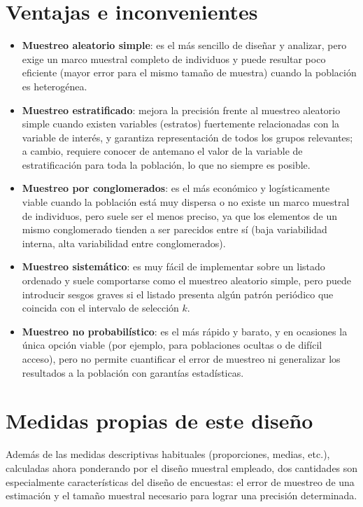 \documentclass[
  spanish,
  a4paper,
]{scrreport}
\providecommand{\tightlist}{%
  \setlength{\itemsep}{0pt}\setlength{\parskip}{0pt}}
\theoremstyle{definition}
\theoremstyle{definition}
\theoremstyle{remark}
\begin{document}
\section{Ventajas e inconvenientes}\label{ventajas-e-inconvenientes-7}

\begin{itemize}
\tightlist
\item
  \textbf{Muestreo aleatorio simple}: es el más sencillo de diseñar y
  analizar, pero exige un marco muestral completo de individuos y puede
  resultar poco eficiente (mayor error para el mismo tamaño de muestra)
  cuando la población es heterogénea.
\item
  \textbf{Muestreo estratificado}: mejora la precisión frente al
  muestreo aleatorio simple cuando existen variables (estratos)
  fuertemente relacionadas con la variable de interés, y garantiza
  representación de todos los grupos relevantes; a cambio, requiere
  conocer de antemano el valor de la variable de estratificación para
  toda la población, lo que no siempre es posible.
\item
  \textbf{Muestreo por conglomerados}: es el más económico y
  logísticamente viable cuando la población está muy dispersa o no
  existe un marco muestral de individuos, pero suele ser el menos
  preciso, ya que los elementos de un mismo conglomerado tienden a ser
  parecidos entre sí (baja variabilidad interna, alta variabilidad entre
  conglomerados).
\item
  \textbf{Muestreo sistemático}: es muy fácil de implementar sobre un
  listado ordenado y suele comportarse como el muestreo aleatorio
  simple, pero puede introducir sesgos graves si el listado presenta
  algún patrón periódico que coincida con el intervalo de selección
  \(k\).
\item
  \textbf{Muestreo no probabilístico}: es el más rápido y barato, y en
  ocasiones la única opción viable (por ejemplo, para poblaciones
  ocultas o de difícil acceso), pero no permite cuantificar el error de
  muestreo ni generalizar los resultados a la población con garantías
  estadísticas.
\end{itemize}

\section{Medidas propias de este
diseño}\label{medidas-propias-de-este-diseuxf1o-7}

Además de las medidas descriptivas habituales (proporciones, medias,
etc.), calculadas ahora ponderando por el diseño muestral empleado, dos
cantidades son especialmente características del diseño de encuestas: el
error de muestreo de una estimación y el tamaño muestral necesario para
lograr una precisión determinada.
\end{document}
